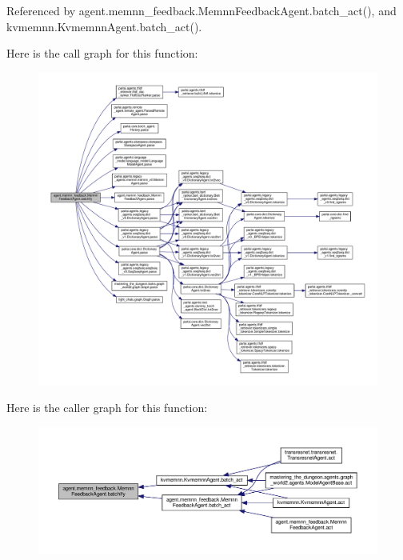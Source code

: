 Referenced by agent.\+memnn\+\_\+feedback.\+Memnn\+Feedback\+Agent.\+batch\+\_\+act(), and kvmemnn.\+Kvmemnn\+Agent.\+batch\+\_\+act().

Here is the call graph for this function\+:
\nopagebreak
\begin{figure}[H]
\begin{center}
\leavevmode
\includegraphics[width=350pt]{classagent_1_1memnn__feedback_1_1MemnnFeedbackAgent_a901865f6607e3b5509831785bc1e29d0_cgraph}
\end{center}
\end{figure}
Here is the caller graph for this function\+:
\nopagebreak
\begin{figure}[H]
\begin{center}
\leavevmode
\includegraphics[width=350pt]{classagent_1_1memnn__feedback_1_1MemnnFeedbackAgent_a901865f6607e3b5509831785bc1e29d0_icgraph}
\end{center}
\end{figure}
\mbox{\label{classagent_1_1memnn__feedback_1_1MemnnFeedbackAgent_af8ee1bfd956442c04bbc6cba45e4c549}} 
